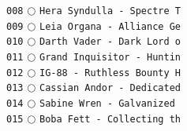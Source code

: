 \documentclass[a4paper,landscape]{article}
\begin{document}
\begin{multicols*}{5}
\texttt{008} \(\bigcirc\)  \texttt{Hera Syndulla - Spectre T} \vspace{-0.3mm}\\ 
\texttt{009} \(\bigcirc\)  \texttt{Leia Organa - Alliance Ge} \vspace{-0.3mm}\\ 
\texttt{010} \(\bigcirc\)  \texttt{Darth Vader - Dark Lord o} \vspace{-0.3mm}\\ 
\texttt{011} \(\bigcirc\)  \texttt{Grand Inquisitor - Huntin} \vspace{-0.3mm}\\ 
\texttt{012} \(\bigcirc\)  \texttt{IG-88 - Ruthless Bounty H} \vspace{-0.3mm}\\ 
\texttt{013} \(\bigcirc\)  \texttt{Cassian Andor - Dedicated} \vspace{-0.3mm}\\ 
\texttt{014} \(\bigcirc\)  \texttt{Sabine Wren - Galvanized } \vspace{-0.3mm}\\ 
\texttt{015} \(\bigcirc\)  \texttt{Boba Fett - Collecting th} \vspace{-0.3mm}\\ 

\end{multicols*}
\end{document}
